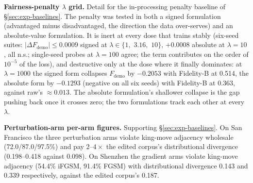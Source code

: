 \textbf{Fairness-penalty $\lambda$ grid.} Detail for the in-processing
penalty baseline of \S\ref{sec:exp-baselines}. The penalty was tested in
both a signed formulation (advantaged minus disadvantaged, the direction the
data over-serves) and an absolute-value formulation. It is inert at every
dose that trains stably (six-seed suites:
$|\Delta F_{\mathrm{demo}}| \le 0.0009$ signed at
$\lambda \in \{1,$ $3.16,$ $10\}$, $+0.0008$ absolute at $\lambda = 10$, all
n.s.; single-seed probes at $\lambda = 100$ agree; the term contributes on
the order of $10^{-5}$ of the loss), and destructive only at the dose where
it finally dominates: at $\lambda = 1000$ the signed form collapses
$F_{\mathrm{demo}}$ by $-0.2053$ with Fidelity-B at 0.514, the absolute form
by $-0.1293$ (negative on all six seeds) with Fidelity-B at 0.363, against raw's
$\approx 0.013$. The absolute formulation's shallower collapse is the gap
pushing back once it crosses zero; the two formulations track each other at
every $\lambda$.

\textbf{Perturbation-arm per-arm figures.} Supporting
\S\ref{sec:exp-baselines}. On San Francisco the three perturbation arms
violate king-move adjacency wholesale (72.0/87.0/97.5\%) and pay
$2$--$4\times$ the edited corpus's distributional divergence (0.198--0.418
against 0.098).
On Shenzhen the gradient arms violate king-move adjacency (54.4\% iFGSM,
91.4\% FGSM) with distributional divergence 0.143 and 0.339 respectively,
against the edited corpus's 0.187.

